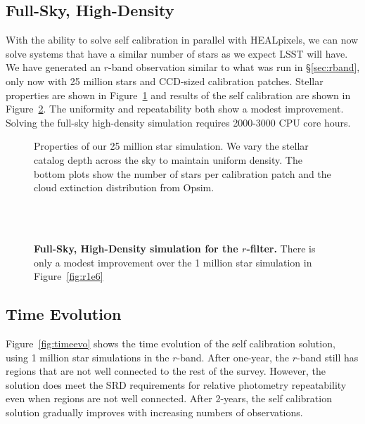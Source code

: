 \documentclass[12pt,preprint]{aastex}
\begin{document}
\subsection{Full-Sky, High-Density}

With the ability to solve self calibration in parallel with HEALpixels, we can now solve systems that have a similar number of stars as we expect LSST will have.  We have generated an $r$-band observation similar to what was run in \S\ref{sec:rband}, only now with 25 million stars and CCD-sized calibration patches.  Stellar properties are shown in Figure~\ref{fig:25mil_about} and results of the self calibration are shown in Figure~\ref{fig:25mil}.  The uniformity and repeatability both show a modest improvement.  Solving the full-sky high-density simulation requires 2000-3000 CPU core hours.  


\begin{figure}
\caption{Properties of our 25 million star simulation.  We vary the stellar catalog depth across the sky to maintain uniform density.  The bottom plots show the number of stars per calibration patch and the cloud extinction distribution from Opsim. \label{fig:25mil_about}}
\end{figure}

\begin{figure}
 \\
 \\
\caption{ {\bf Full-Sky, High-Density simulation for the $r$-filter.}  There is only a modest improvement over the 1 million star simulation in Figure~\ref{fig:r1e6}  \label{fig:25mil}}
\end{figure}


\subsection{Time Evolution}

Figure~\ref{fig:timeevo} shows the time evolution of the self calibration solution, using 1 million star simulations in the $r$-band.  After one-year, the $r$-band still has regions that are not well connected to the rest of the survey.  However, the solution does meet the SRD requirements for relative photometry repeatability even when regions are not well connected.  After 2-years, the self calibration solution gradually improves with increasing numbers of observations.  
\end{document}
